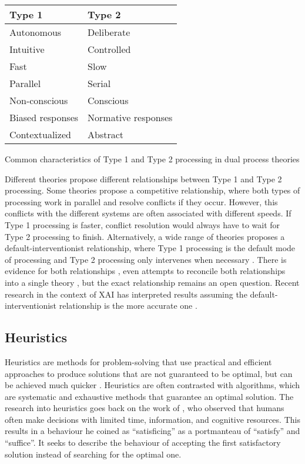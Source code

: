 \begin{ctable}
    \begin{tabularx}{0.5\textwidth}{l|l}
        \textbf{Type 1} & \textbf{Type 2} \\
        \hline
        Autonomous & Deliberate \\
        Intuitive & Controlled \\
        \hline
        Fast & Slow \\
        Parallel & Serial \\
        Non-conscious & Conscious \\
        Biased responses & Normative responses \\
        Contextualized & Abstract \\
    \end{tabularx}
    \caption[Type 1 and Type 2 Characteristics]{Common characteristics of Type 1 and Type 2 processing in dual process theories \parencite{Evans2013}}
    \label{tab:dual_process_characteristics}
\end{ctable}

Different theories propose different relationships between Type 1 and Type 2 processing. Some theories propose a competitive relationship, where both types of processing work in parallel and resolve conflicts if they occur. However, this conflicts with the different systems are often associated with different speeds. If Type 1 processing is faster, conflict resolution would always have to wait for Type 2 processing to finish. Alternatively, a wide range of theories proposes a default-interventionist relationship, where Type 1 processing is the default mode of processing and Type 2 processing only intervenes when necessary \parencite{Evans2013}. There is evidence for both relationships \parencite{Evans2013}, even attempts to reconcile both relationships into a single theory \parencite{Djulbegovic2012}, but the exact relationship remains an open question. Recent research in the context of \ac{XAI} has interpreted results assuming the default-interventionist relationship is the more accurate one \parencite{Jussupow2021, Shin2021}.

\subsection{Heuristics} \label{ssec:heuristics}

Heuristics are methods for problem-solving that use practical and efficient approaches to produce solutions that are not guaranteed to be optimal, but can be achieved much quicker \parencite{Gigerenzer2011}. Heuristics are often contrasted with algorithms, which are systematic and exhaustive methods that guarantee an optimal solution. The research into heuristics goes back on the work of \cite{Simon1955}, who observed that humans often make decisions with limited time, information, and cognitive resources. This results in a behaviour he coined as “satisficing” \parencite{Simon1956} as a portmanteau of “satisfy” and “suffice”. It seeks to describe the behaviour of accepting the first satisfactory solution instead of searching for the optimal one.

